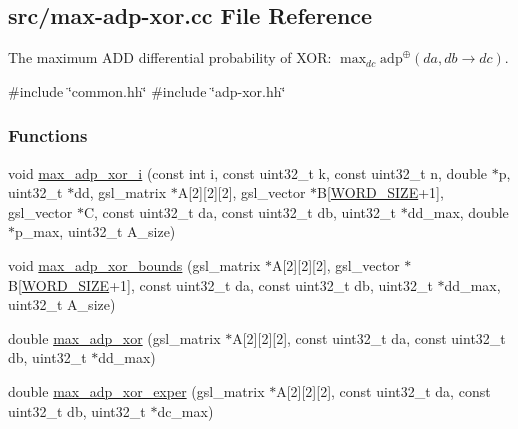 \hypertarget{max-adp-xor_8cc}{\subsection{src/max-\/adp-\/xor.cc \-File \-Reference}
\label{max-adp-xor_8cc}
}


\-The maximum \-A\-D\-D differential probability of \-X\-O\-R\-: $\max_{dc} \mathrm{adp}^{\oplus}(da, db \rightarrow dc)$.  


{\ttfamily \#include \char`\"{}common.\-hh\char`\"{}}\*
{\ttfamily \#include \char`\"{}adp-\/xor.\-hh\char`\"{}}\*
\subsubsection*{\-Functions}
\begin{DoxyCompactItemize}
\item 
void \hyperlink{max-adp-xor_8cc_a2c8bd5dba3223b07f3606c2240d0a4b2}{max\-\_\-adp\-\_\-xor\-\_\-i} (const int i, const uint32\-\_\-t k, const uint32\-\_\-t n, double $\ast$p, uint32\-\_\-t $\ast$dd, gsl\-\_\-matrix $\ast$\-A\mbox{[}2\mbox{]}\mbox{[}2\mbox{]}\mbox{[}2\mbox{]}, gsl\-\_\-vector $\ast$\-B\mbox{[}\hyperlink{common_8hh_a92ed8507d1cd2331ad09275c5c4c1c89}{\-W\-O\-R\-D\-\_\-\-S\-I\-Z\-E}+1\mbox{]}, gsl\-\_\-vector $\ast$\-C, const uint32\-\_\-t da, const uint32\-\_\-t db, uint32\-\_\-t $\ast$dd\-\_\-max, double $\ast$p\-\_\-max, uint32\-\_\-t \-A\-\_\-size)
\item 
void \hyperlink{max-adp-xor_8cc_ab44746fae93c11ea36bd24f4f874669d}{max\-\_\-adp\-\_\-xor\-\_\-bounds} (gsl\-\_\-matrix $\ast$\-A\mbox{[}2\mbox{]}\mbox{[}2\mbox{]}\mbox{[}2\mbox{]}, gsl\-\_\-vector $\ast$\-B\mbox{[}\hyperlink{common_8hh_a92ed8507d1cd2331ad09275c5c4c1c89}{\-W\-O\-R\-D\-\_\-\-S\-I\-Z\-E}+1\mbox{]}, const uint32\-\_\-t da, const uint32\-\_\-t db, uint32\-\_\-t $\ast$dd\-\_\-max, uint32\-\_\-t \-A\-\_\-size)
\item 
double \hyperlink{max-adp-xor_8cc_aa66f59ae4d29988f90f525ce600d6045}{max\-\_\-adp\-\_\-xor} (gsl\-\_\-matrix $\ast$\-A\mbox{[}2\mbox{]}\mbox{[}2\mbox{]}\mbox{[}2\mbox{]}, const uint32\-\_\-t da, const uint32\-\_\-t db, uint32\-\_\-t $\ast$dd\-\_\-max)
\item 
double \hyperlink{max-adp-xor_8cc_a7b91b512d304a58a701f631be1f863a1}{max\-\_\-adp\-\_\-xor\-\_\-exper} (gsl\-\_\-matrix $\ast$\-A\mbox{[}2\mbox{]}\mbox{[}2\mbox{]}\mbox{[}2\mbox{]}, const uint32\-\_\-t da, const uint32\-\_\-t db, uint32\-\_\-t $\ast$dc\-\_\-max)
\end{DoxyCompactItemize}


